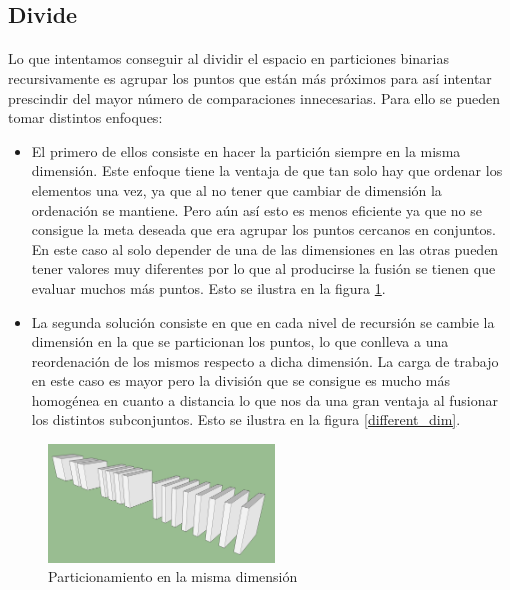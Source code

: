 \documentclass{article}
\begin{document}
	\subsection{Divide}
		\paragraph{}
		Lo que intentamos conseguir al dividir el espacio en particiones binarias recursivamente es agrupar los puntos que están más próximos para así intentar prescindir del mayor número de comparaciones innecesarias. Para ello se pueden tomar distintos enfoques:

		\begin{itemize}

			\item
			El primero de ellos consiste en hacer la partición siempre en la misma dimensión. Este enfoque tiene la ventaja de que tan solo hay que ordenar los elementos una vez, ya que al no tener que cambiar de dimensión la ordenación se mantiene. Pero aún así esto es menos eficiente ya que no se consigue la meta deseada que era agrupar los puntos cercanos en conjuntos. En este caso al solo depender de una de las dimensiones en las otras pueden tener valores muy diferentes por lo que al producirse la fusión se tienen que evaluar muchos más puntos. Esto se ilustra en la figura \ref{same_dim}.

			\item
			La segunda solución consiste en que en cada nivel de recursión se cambie la dimensión en la que se particionan los puntos, lo que conlleva a una reordenación de los mismos respecto a dicha dimensión. La carga de trabajo en este caso es mayor pero la división que se consigue es mucho más homogénea en cuanto a distancia lo que nos da una gran ventaja al fusionar los distintos subconjuntos. Esto se ilustra en la figura \ref{different_dim}.

		\end{itemize}



	\begin{figure}[ht!]
		\centering
		\includegraphics[width=60mm]{cube_division_1.jpg}
		\caption{Particionamiento en la misma dimensión \label{same_dim}}
	\end{figure}
\end{document}
